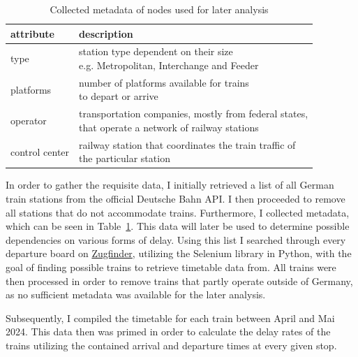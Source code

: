 \documentclass[12pt,a4paper]{article}
\begin{document}
\begin{table}[b]
  \centering
  \begin{tabular}{ll}
  \hline
  attribute      & description                                                                                      \\ \hline
  type           & \makecell{station type dependent on their size \\ e.g. Metropolitan, Interchange and Feeder}                                                            \\
  platforms      & \makecell{number of platforms available for trains \\ to depart or arrive}                                     \\
  operator       & \makecell{transportation companies, mostly from federal states, \\ that operate a network of railway stations} \\
  control center & \makecell{railway station that coordinates the train traffic of \\ the particular station}                     \\ \hline
  \end{tabular}
  \caption{Collected metadata of nodes used for later analysis}
  \label{fig:network-metadata}
\end{table}

In order to gather the requisite data, I initially retrieved a list of all German train stations from the official Deutsche Bahn API. 
I then proceeded to remove all stations that do not accommodate trains. Furthermore, I collected metadata, which can be seen in Table~\ref{fig:network-metadata}. 
This data will later be used to determine possible dependencies on various forms of delay. Using this list I searched through every departure board on \href{https://www.zugfinder.net/en/start}{Zugfinder}, utilizing the Selenium library in Python, with the goal of finding possible trains to retrieve timetable data from. 
All trains were then processed in order to remove trains that partly operate outside of Germany, as no sufficient metadata was available for the later analysis. 

Subsequently, I compiled the timetable for each train between April and Mai 2024. This data then was primed in order to calculate the delay rates of the trains utilizing the contained arrival and departure times at every given stop.

\maketitle
\end{document}
